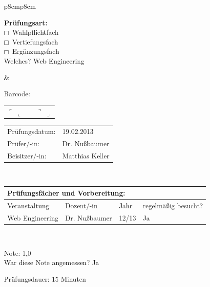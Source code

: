\documentclass[a4paper]{article}
\newcommand{\Fach}{Web Engineering}
\newcommand{\Pruefungsdatum}{19.02.2013}    %
\newcommand{\Pruefer}{Dr. Nußbaumer}
\newcommand{\Beisitzer}{Matthias Keller}
\newcommand{\Note}{1,0}
\newcommand{\Dauer}{15} %
\begin{document}
\begin{tabular}{p{8cm}p{8cm}}
\begin{flushleft}
   \textbf{Prüfungsart:}\\
   $\boxempty$ Wahlpflichtfach  \\
   $\boxempty$ Vertiefungsfach  \\
   $\boxempty$ Ergänzungsfach  \\[0.5cm]
   Welches? \Fach
  \end{flushleft}
  &
  \begin{center}
   Barcode:
   \begin{tabular}{p{0.2cm}p{6.8cm}p{0.2cm}}
   $\ulcorner$
   \vskip 2cm
   $\llcorner$ & & $\urcorner$
   \vskip 2cm
   $\lrcorner$ \\
   \end{tabular}
  \end{center}
  \vskip 0.5cm
  \begin{flushright}
  \begin{tabular}{ll}
   Prüfungsdatum:   & \Pruefungsdatum \\[0.5cm]
   Prüfer/-in:      & \Pruefer \\[0.5cm]
   Beisitzer/-in:   & \Beisitzer \\
  \end{tabular}
  \end{flushright} \\
 \end{tabular}

 \begin{tabular}{|p{8.2cm}|p{3cm}|p{1cm}|p{3.5cm}|}
  \multicolumn{4}{l}{\bfseries Prüfungsfächer und Vorbereitung: } \\[0.2cm]
  \hline
  Veranstaltung & Dozent/-in  & Jahr & regelmäßig besucht? \\
  \hline
  \hline
  Web Engineering & Dr. Nußbaumer & 12/13 &  Ja \\[0.2cm]
  \hline
 \end{tabular} \\[0.5cm]

\begin{multicols}{2}
Note: \Note\\[0.5cm]
War diese Note angemessen?
Ja

\columnbreak
Prüfungsdauer: \Dauer{} Minuten \\[0.5cm]
\end{multicols}
\end{document}
